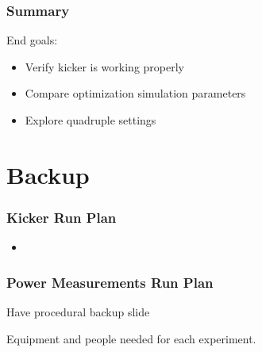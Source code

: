 \documentclass[professionalfonts,t]{beamer}
\begin{document}
\begin{frame}
	\frametitle{Summary}
	End goals:
	\begin{itemize}
		\item Verify kicker is working properly
		\item Compare optimization simulation parameters
		\item Explore quadruple settings
	\end{itemize}
	
	
	
\end{frame}



\section{Backup}
\begin{frame}
\frametitle{Kicker Run Plan}
	\begin{itemize}
		\item 
	\end{itemize}

\end{frame}

\begin{frame}
	\frametitle{Power Measurements Run Plan}
	Have procedural backup slide
\end{frame}

\begin{frame}
	Equipment and people needed for each experiment.
\end{frame}
\end{document}
